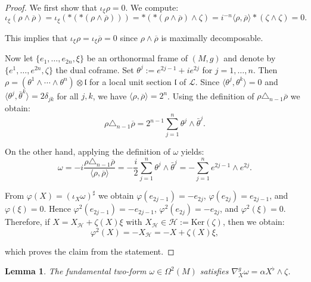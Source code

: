 \documentclass[10pt,a4paper,twoside,reqno]{amsart}
\theoremstyle{plain}
\newtheorem{lemma}[thm]{Lemma}
\theoremstyle{definition}
\theoremstyle{remark}
\newcommand{\escal}[1]{\langle#1\rangle}
\renewcommand{\ker}{\mathrm{Ker}}
\begin{document}
\begin{proof}
We first show that $\iota_\xi\rho=0$. We compute:
\begin{equation*}
\iota_\xi(\rho\wedge\overline{\rho})=\iota_\xi(*(*(\rho\wedge\overline{\rho})))=*(*(\rho\wedge\overline{\rho})\wedge\zeta)=i^{-n}\escal{\rho,\overline{\rho}}*(\zeta\wedge\zeta)=0.
\end{equation*}

\noindent
This implies that $\iota_\xi\rho=\iota_\xi\overline{\rho}=0$ since $\rho\wedge\overline{\rho}$ is maximally decomposable.\medskip

Now let $\{e_1,\ldots,e_{2n},\xi\}$ be an orthonormal frame of $(M,g)$ and denote by $\{e^1,\ldots,e^{2n},\zeta\}$ the dual coframe. Set $\theta^j:=e^{2j-1}+ie^{2j}$ for $j=1,\ldots,n$. Then $\rho=(\theta^1 \wedge \cdots \wedge \theta^n)\otimes\mathfrak{l}$ for a local unit section $\mathfrak{l}$ of $\mathcal{L}$. Since $\escal{\theta^j,\theta^k}=0$ and $\escal{\theta^j,\bar{\theta}^k}=2\delta_{jk}$ for all $j,k$, we have $\escal{\rho,\overline{\rho}}=2^n$. Using the definition of $\rho \triangle_{n-1}\overline{\rho}$ we obtain:
\begin{equation*}
\rho\triangle_{n-1}\overline{\rho}=2^{n-1}\sum_{j=1}^n\theta^j\wedge\bar{\theta}^j .
\end{equation*}

\noindent
On the other hand, applying the definition of $\omega$ yields:
\begin{equation*}
\omega=-i\frac{\rho\triangle_{n-1}\overline{\rho}}{\escal{\rho,\overline{\rho}}}=-\frac{i}{2}\sum_{j=1}^n\theta^j\wedge\bar{\theta}^j=-\sum_{j=1}^n e^{2j-1}\wedge e^{2j}.
\end{equation*}

\noindent
From $\varphi(X)=(\iota_X\omega)^\sharp$ we obtain $\varphi(e_{2j-1})=-e_{2j}$, $\varphi(e_{2j})=e_{2j-1}$, and $\varphi(\xi)=0$. Hence $\varphi^2(e_{2j-1})=-e_{2j-1}$, $\varphi^2(e_{2j})=-e_{2j}$, and $\varphi^2(\xi)=0$. Therefore, if $X=X_{\mathcal{H}}+\zeta(X)\xi$ with $X_{\mathcal{H}}\in\mathcal{H}:=\ker(\zeta)$, then we obtain:
\begin{equation*}
\varphi^2(X)=-X_{\mathcal{H}}=-X+\zeta(X)\xi,
\end{equation*}

\noindent
which proves the claim from the statement.
\end{proof}

\begin{lemma}\label{lemma:nabla_omega}
The fundamental two-form $\omega\in\Omega^2(M)$ satisfies $\nabla^g_X\omega=\alpha X^\flat\wedge\zeta$.
\end{lemma}
\end{document}
